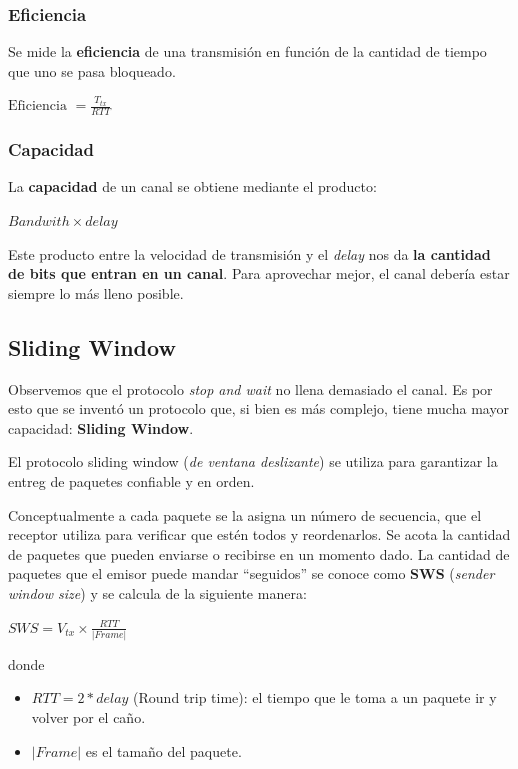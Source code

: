 \documentclass[]{article}
\begin{document}


\subsubsection{Eficiencia}
Se mide la \textbf{eficiencia} de una transmisión en función de la cantidad de tiempo que uno se pasa bloqueado.
\begin{center}
    $\displaystyle \text{Eficiencia }= \frac{T_{tx}}{RTT}$ %
\end{center}

\subsubsection{Capacidad}
La \textbf{capacidad} de un canal se obtiene mediante el producto:
\begin{center}
    $\displaystyle Bandwith \times delay$
\end{center}

Este producto entre la velocidad de transmisión y el \emph{delay} nos da \textbf{la cantidad de bits que entran en un canal}. Para aprovechar mejor, el canal debería estar siempre lo más lleno posible.


\subsection{Sliding Window}
Observemos que el protocolo \emph{stop and wait} no llena demasiado el canal. Es por esto que se inventó un protocolo que, si bien es más complejo, tiene mucha mayor capacidad: \textbf{Sliding Window}.



El protocolo sliding window (\emph{de ventana deslizante}) se utiliza para garantizar la entreg de paquetes confiable y en orden.

Conceptualmente a cada paquete se la asigna un número de secuencia, que el receptor utiliza para verificar que estén todos y reordenarlos. Se acota la cantidad de paquetes que pueden enviarse o recibirse en un momento dado. La cantidad de paquetes que el emisor puede mandar ``seguidos'' se conoce como \textbf{SWS} (\emph{sender window size}) y se calcula de la siguiente manera:

\begin{center}
    $SWS = V_{tx}\times \displaystyle \frac{RTT}{|Frame|}$
\end{center}

donde
\begin{itemize}
    \item $RTT = 2*delay$ (Round trip time): el tiempo que le toma a un paquete ir y volver por el caño.
    \item $|Frame|$ es el tamaño del paquete.
\end{itemize}
\end{document}
